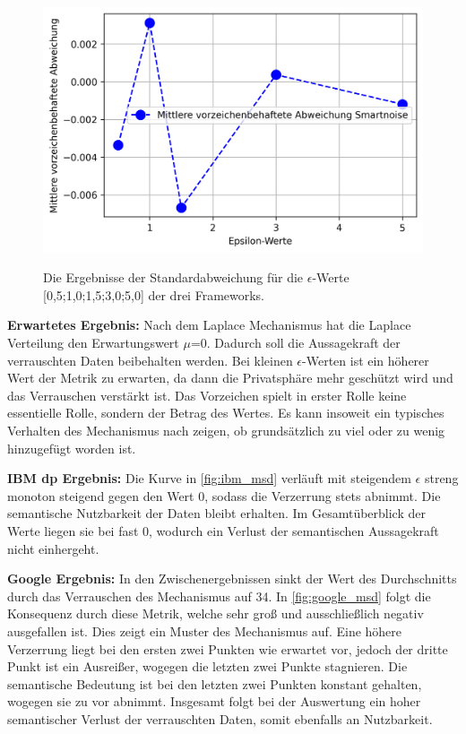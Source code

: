 \begin{figure}[htbp]
{		\includegraphics[scale=0.4]{./images/sn_msd.png}
	}
	\caption{Die Ergebnisse der Standardabweichung für die $\epsilon$-Werte [0,5;1,0;1,5;3,0;5,0] der drei Frameworks.}
	\label{fig:msd}
\end{figure}

\textbf{Erwartetes Ergebnis:}
Nach dem Laplace Mechanismus hat die Laplace Verteilung den Erwartungswert $\mu$=$0$. Dadurch soll die Aussagekraft der verrauschten Daten beibehalten werden. Bei kleinen $\epsilon$-Werten ist ein höherer Wert der Metrik zu erwarten,  da dann die Privatsphäre mehr geschützt wird und das Verrauschen verstärkt ist. Das Vorzeichen spielt in erster Rolle keine essentielle Rolle, sondern der Betrag des Wertes. Es kann insoweit ein typisches Verhalten des Mechanismus nach zeigen, ob grundsätzlich zu viel oder zu wenig hinzugefügt worden ist.

\textbf{IBM \gls{dp} Ergebnis:}
Die Kurve in \cref{fig:ibm_msd} verläuft mit steigendem $\epsilon$ streng monoton steigend gegen den Wert $0$, sodass die Verzerrung stets abnimmt. Die semantische Nutzbarkeit der Daten bleibt erhalten. Im Gesamtüberblick der Werte liegen sie bei fast $0$, wodurch ein Verlust der semantischen Aussagekraft  nicht einhergeht.

\textbf{Google Ergebnis:}
In den Zwischenergebnissen sinkt der Wert des Durchschnitts durch das Verrauschen des Mechanismus auf 34. In \cref{fig:google_msd} folgt die Konsequenz durch diese Metrik, welche sehr groß und ausschließlich negativ ausgefallen ist. Dies zeigt ein Muster des Mechanismus auf. Eine höhere Verzerrung liegt bei den ersten zwei Punkten wie erwartet vor, jedoch der dritte Punkt ist ein Ausreißer, wogegen die letzten zwei Punkte stagnieren. Die semantische Bedeutung ist bei den letzten zwei Punkten konstant gehalten, wogegen sie zu vor abnimmt. Insgesamt folgt bei der Auswertung ein hoher semantischer Verlust der verrauschten Daten, somit ebenfalls an Nutzbarkeit.

